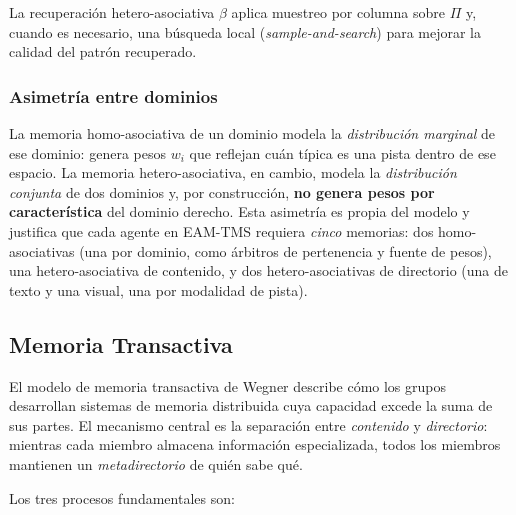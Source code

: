 La recuperación hetero-asociativa $\beta$ aplica muestreo por columna sobre $\Pi$ y,
cuando es necesario, una búsqueda local (\emph{sample-and-search}) para mejorar la
calidad del patrón recuperado.

\subsubsection*{Asimetría entre dominios}

La memoria homo-asociativa de un dominio modela la \emph{distribución marginal} de ese
dominio: genera pesos $w_i$ que reflejan cuán típica es una pista dentro de ese espacio.
La memoria hetero-asociativa, en cambio, modela la \emph{distribución conjunta} de dos
dominios y, por construcción, \textbf{no genera pesos por característica} del dominio derecho.
Esta asimetría es propia del modelo y justifica que cada agente en EAM-TMS requiera
\emph{cinco} memorias: dos homo-asociativas (una por dominio, como
árbitros de pertenencia y fuente de pesos), una hetero-asociativa de contenido, y
dos hetero-asociativas de directorio (una de texto y una visual, una por modalidad de pista).

\subsection{Memoria Transactiva}
\label{sec:tmt}

El modelo de memoria transactiva de Wegner \cite{wegner1987transactive} describe cómo
los grupos desarrollan sistemas de memoria distribuida cuya capacidad excede la suma
de sus partes.
El mecanismo central es la separación entre \emph{contenido} y \emph{directorio}:
mientras cada miembro almacena información especializada, todos los miembros mantienen
un \emph{metadirectorio} de quién sabe qué.

Los tres procesos fundamentales son:

